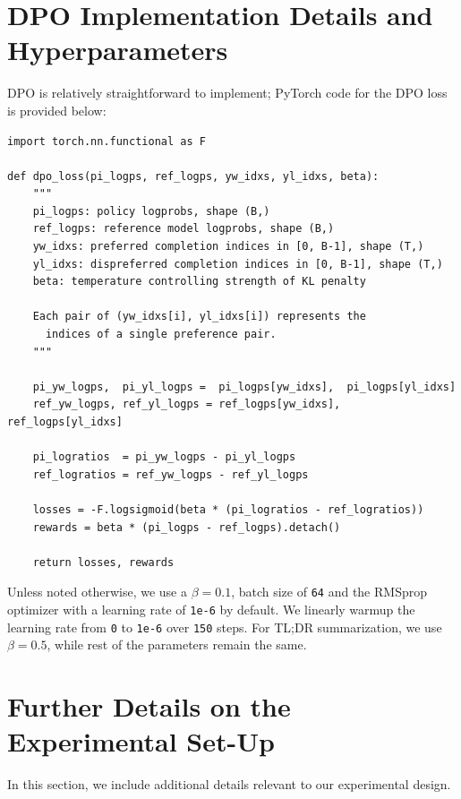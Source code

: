 \documentclass{article}
\begin{document}
\section{DPO Implementation Details and Hyperparameters}
\label{app:implementation}
DPO is relatively straightforward to implement; PyTorch code for the DPO loss is provided below:
\clearpage
\begin{verbatim}
import torch.nn.functional as F

def dpo_loss(pi_logps, ref_logps, yw_idxs, yl_idxs, beta):
    """
    pi_logps: policy logprobs, shape (B,)
    ref_logps: reference model logprobs, shape (B,)
    yw_idxs: preferred completion indices in [0, B-1], shape (T,)
    yl_idxs: dispreferred completion indices in [0, B-1], shape (T,)
    beta: temperature controlling strength of KL penalty

    Each pair of (yw_idxs[i], yl_idxs[i]) represents the
      indices of a single preference pair.
    """

    pi_yw_logps,  pi_yl_logps =  pi_logps[yw_idxs],  pi_logps[yl_idxs]
    ref_yw_logps, ref_yl_logps = ref_logps[yw_idxs], ref_logps[yl_idxs]

    pi_logratios  = pi_yw_logps - pi_yl_logps
    ref_logratios = ref_yw_logps - ref_yl_logps

    losses = -F.logsigmoid(beta * (pi_logratios - ref_logratios))
    rewards = beta * (pi_logps - ref_logps).detach()

    return losses, rewards
\end{verbatim}

Unless noted otherwise, we use a $\beta = 0.1$, batch size of \texttt{64} and the RMSprop optimizer with a learning rate of \texttt{1e-6} by default. We linearly warmup the learning rate from \texttt{0} to \texttt{1e-6} over \texttt{150} steps. For TL;DR summarization, we use $\beta=0.5$, while rest of the parameters remain the same.

\section{Further Details on the Experimental Set-Up}
\label{app:exp_details}
In this section, we include additional details relevant to our experimental design.
\end{document}

